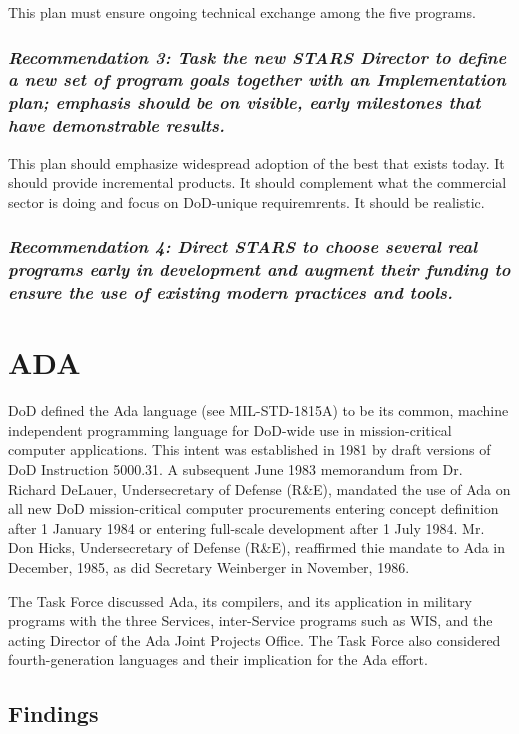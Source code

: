 \documentclass[12pt,final]{article}
\begin{document}
This plan must ensure ongoing technical exchange among the five programs.

\subsubsection*{\textit{Recommendation 3: Task the new STARS Director to define a new set of
program goals together with an Implementation plan; emphasis should be on
visible, early milestones that have demonstrable results.}}

This plan should emphasize widespread adoption of the best that exists today.
It should provide incremental products. It should complement what the
commercial sector is doing and focus on DoD-unique requiremrents. It should be
realistic.

\subsubsection*{\textit{Recommendation 4: Direct STARS to choose several real
programs early in development and augment their funding to ensure the use of
existing modern practices and tools.}}

\section{ADA}

DoD defined the Ada language (see MIL-STD-1815A) to be its common,
machine independent programming language for DoD-wide use in mission-critical
computer applications. This intent was established in 1981 by draft versions of
DoD Instruction 5000.31. A subsequent June 1983 memorandum from Dr. Richard
DeLauer, Undersecretary of Defense (R\&E), mandated the use of Ada on all new
DoD mission-critical computer procurements entering concept definition after 1
January 1984 or entering full-scale development after 1 July 1984. Mr. Don
Hicks, Undersecretary of Defense (R\&E), reaffirmed thie mandate to Ada in
December, 1985, as did Secretary Weinberger in November, 1986.

The Task Force discussed Ada, its compilers, and its application in military
programs with the three Services, inter-Service programs such as WIS, and the
acting Director of the Ada Joint Projects Office. The Task Force also
considered fourth-generation languages and their implication for the Ada
effort.

\subsection*{Findings}
\end{document}
